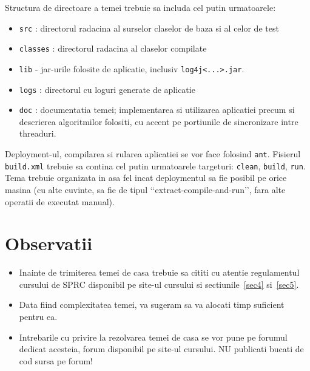 \documentclass[a4paper]{article}
\begin{document}
\par Structura de directoare a temei trebuie sa includa cel putin urmatoarele:

\begin{itemize}[noitemsep]
	\item \texttt{src} : directorul radacina al surselor claselor de baza si al celor de test
	\item \texttt{classes} : directorul radacina al claselor compilate
	\item \texttt{lib} - jar-urile folosite de aplicatie, inclusiv \texttt{log4j<...>.jar}.
	\item \texttt{logs} : directorul cu loguri generate de aplicatie
	\item \texttt{doc} : documentatia temei; implementarea si utilizarea aplicatiei precum si descrierea algoritmilor folositi, cu accent pe portiunile de sincronizare intre threaduri.
\end{itemize}

\par Deployment-ul, compilarea si rularea aplicatiei se vor face folosind \texttt{ant}. Fisierul \texttt{build.xml} trebuie sa contina cel putin urmatoarele targeturi: \texttt{clean}, \texttt{build}, \texttt{run}. Tema trebuie organizata in asa fel incat deploymentul sa fie posibil pe orice masina (cu alte cuvinte, sa fie de tipul \lq\lq{}extract-compile-and-run\rq\rq{}, fara alte operatii de executat manual).

\section{Observatii}
\label{sec6}

\begin{itemize}
	\item Inainte de trimiterea temei de casa trebuie sa cititi cu atentie regulamentul cursului de SPRC disponibil pe site-ul cursului si sectiunile~\ref{sec4} si~\ref{sec5}.
	\item Data fiind complexitatea temei, va sugeram sa va alocati timp suficient pentru ea.
	\item Intrebarile cu privire la rezolvarea temei de casa se vor pune pe forumul dedicat acesteia, forum disponibil pe site-ul cursului. NU publicati bucati de cod sursa pe forum!
\end{itemize}

\end{document}
